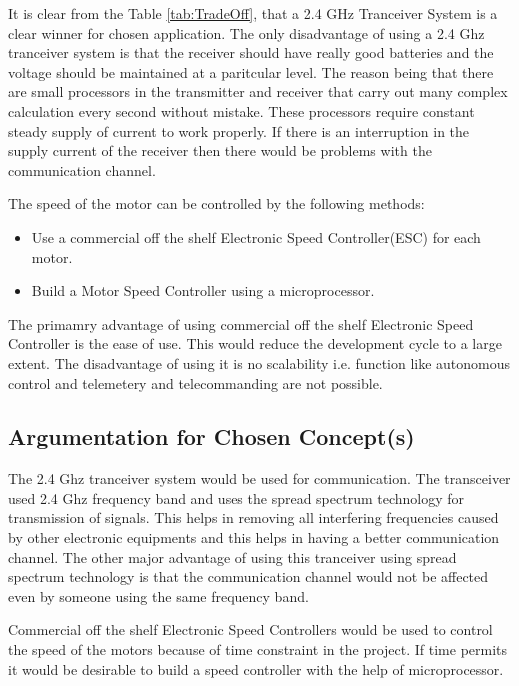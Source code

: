 It is clear from the Table \ref{tab:TradeOff}, that a 2.4 GHz Tranceiver System is a clear winner for chosen application. The only disadvantage of using a 2.4 Ghz tranceiver system is that the receiver should have really good batteries and the voltage should be maintained at a paritcular level. The reason being that there are small processors in the transmitter and receiver that carry out many complex calculation every second without mistake. These processors require constant steady supply of current to work properly. If there is an interruption in the supply current of the receiver then there would be problems with the communication channel.

The speed of the motor can be controlled by the following methods:
\begin{itemize}
\item Use a commercial off the shelf Electronic Speed Controller(ESC) for each motor.
\item Build a Motor Speed Controller using a microprocessor.
\end{itemize}

The primamry advantage of using commercial off the shelf Electronic Speed Controller is the ease of use. This would reduce the development cycle to a large extent. The disadvantage of using it is no scalability i.e. function like autonomous control and telemetery and telecommanding are not possible.

\subsection{Argumentation for Chosen Concept(s)}

The 2.4 Ghz tranceiver system would be used for communication. The transceiver used 2.4 Ghz frequency band and uses the spread spectrum technology for transmission of signals. This helps in removing all interfering frequencies caused by other electronic equipments and this helps in having a better communication channel. The other major advantage of using this tranceiver using spread spectrum technology is that the communication channel would not be affected even by someone using the same frequency band.

Commercial off the shelf Electronic Speed Controllers would be used to control the speed of the motors because of time constraint in the project. If time permits it would be desirable to build a speed controller with the help of microprocessor.

